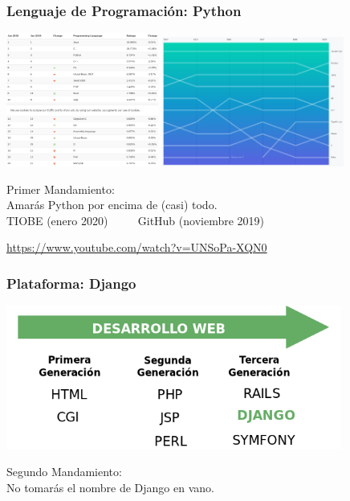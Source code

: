 \begin{frame}
\frametitle{Lenguaje de Programación: Python}

\begin{center}
\includegraphics[width=5cm]{figs/2020-most-popular-lang-tiobe}
\includegraphics[width=6cm]{figs/2019-most-popular-lang-github}
\end{center}

\begin{center}
  {\Large Primer Mandamiento: \\ Amarás Python por encima de (casi) todo.} \\
  TIOBE (enero 2020) ~~~~ GitHub (noviembre 2019) \\
\end{center}

\begin{flushright}
  \url{https://www.youtube.com/watch?v=UNSoPa-XQN0}
\end{flushright}
\end{frame}
\usebackgroundtemplate{}



\begin{frame}
\frametitle{Plataforma: Django}

\begin{center}
\includegraphics[width=11cm]{figs/django.png}
\end{center}

\begin{center}
\Large Segundo Mandamiento: \\ No tomarás el nombre de Django en vano.
\end{center}


\end{frame}
\usebackgroundtemplate{}

